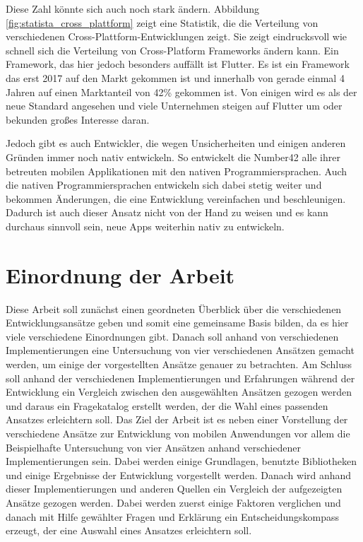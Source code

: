 Diese Zahl könnte sich auch noch stark ändern. Abbildung \ref{fig:statista_cross_plattform} zeigt eine Statistik, die die Verteilung von verschiedenen Cross-Plattform-Entwicklungen zeigt. Sie zeigt eindrucksvoll wie schnell sich die Verteilung von Cross-Platform Frameworks ändern kann. Ein Framework, das hier jedoch besonders auffällt ist Flutter. Es ist ein Framework das erst 2017 auf den Markt gekommen ist und innerhalb von gerade einmal 4 Jahren auf einen Marktanteil von 42\% gekommen ist. Von einigen wird es als der neue Standard angesehen und viele Unternehmen steigen auf Flutter um oder bekunden großes Interesse daran. 

Jedoch gibt es auch Entwickler, die wegen Unsicherheiten und einigen anderen Gründen immer noch nativ entwickeln. So entwickelt die Number42 alle ihrer betreuten mobilen Applikationen mit den nativen Programmiersprachen. Auch die nativen Programmiersprachen entwickeln sich dabei stetig weiter und bekommen Änderungen, die eine Entwicklung vereinfachen und beschleunigen. Dadurch ist auch dieser Ansatz nicht von der Hand zu weisen und es kann durchaus sinnvoll sein, neue Apps weiterhin nativ zu entwickeln.

\section{Einordnung der Arbeit}
Diese Arbeit soll zunächst einen geordneten Überblick über die verschiedenen Entwicklungsansätze geben und somit eine gemeinsame Basis bilden, da es hier viele verschiedene Einordnungen gibt.
Danach soll anhand von verschiedenen Implementierungen eine Untersuchung von vier verschiedenen Ansätzen gemacht werden, um einige der vorgestellten Ansätze genauer zu betrachten.
Am Schluss soll anhand der verschiedenen Implementierungen und Erfahrungen während der Entwicklung ein Vergleich zwischen den ausgewählten Ansätzen gezogen werden und daraus ein Fragekatalog erstellt werden, der die Wahl eines passenden Ansatzes erleichtern soll.
Das Ziel der Arbeit ist es neben einer Vorstellung der verschiedene Ansätze zur Entwicklung von mobilen Anwendungen vor allem die Beispielhafte Untersuchung von vier Ansätzen anhand verschiedener Implementierungen sein. Dabei werden einige Grundlagen, benutzte Bibliotheken und einige Ergebnisse der Entwicklung vorgestellt werden. Danach wird anhand dieser Implementierungen und anderen Quellen ein Vergleich der aufgezeigten Ansätze gezogen werden. Dabei werden zuerst einige Faktoren verglichen und danach mit Hilfe gewählter Fragen und Erklärung ein Entscheidungskompass  erzeugt, der eine Auswahl eines Ansatzes erleichtern soll.
 
